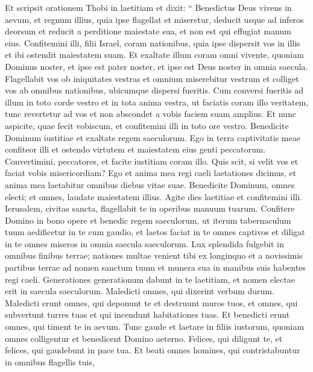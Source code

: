 \begin{biblechapter}
\begin{biblechapter}
\begin{biblechapter}
\begin{biblechapter}
\begin{biblechapter}
\begin{biblechapter}
\begin{biblechapter}
\begin{biblechapter}
\begin{biblechapter}
\begin{biblechapter}
\begin{biblechapter}
\begin{biblechapter}
\begin{biblechapter}
\verse Et scripsit orationem Thobi in laetitiam et dixit:
 \verse “ Benedictus Deus vivens in aevum, et regnum illius,
 quia ipse flagellat et miseretur,
 deducit usque ad inferos deorsum
 et reducit a perditione maiestate sua,
 et non est qui effugiat manum eius. 
\verse Confitemini illi, filii Israel, coram nationibus,
 quia ipse dispersit vos in illis
 \verse et ibi ostendit maiestatem suam.
 Et exaltate illum coram omni vivente,
 quoniam Dominus noster, et ipse est pater noster,
 et ipse est Deus noster in omnia saecula.
 \verse Flagellabit vos ob iniquitates vestras
 et omnium miserebitur vestrum
 et colliget vos ab omnibus nationibus,
 ubicumque dispersi fueritis.
 \verse Cum conversi fueritis ad illum
 in toto corde vestro et in tota anima vestra,
 ut faciatis coram illo veritatem,
 tunc revertetur ad vos
 et non abscondet a vobis faciem suam amplius.
 Et nunc aspicite, quae fecit vobiscum,
 et confitemini illi in toto ore vestro. Benedicite Dominum iustitiae
 et exaltate regem saeculorum.
 Ego in terra captivitatis meae confiteor illi
 et ostendo virtutem et maiestatem eius genti peccatorum.
 Convertimini, peccatores, et facite iustitiam coram illo.
 Quis scit, si velit vos et faciat vobis misericordiam?
 \verse Ego et anima mea regi caeli laetationes dicimus,
 et anima mea laetabitur omnibus diebus vitae suae.
 \verse Benedicite Dominum, omnes electi; et omnes, laudate maiestatem illius. Agite dies laetitiae et confitemini illi.
 \verse Ierusalem, civitas sancta,
 flagellabit te in operibus manuum tuarum.
 \verse Confitere Domino in bono opere et benedic regem saeculorum,
 ut iterum tabernaculum tuum aedificetur in te cum gaudio,
 et laetos faciat in te omnes captivos et diligat in te omnes miseros in omnia saecula saeculorum.
 \verse Lux splendida fulgebit in omnibus finibus terrae;
 nationes multae venient tibi ex longinquo
 et a novissimis partibus terrae ad nomen sanctum tuum
 et munera sua in manibus suis habentes regi caeli.
 Generationes generationum dabunt in te laetitiam,
 et nomen electae erit in saecula saeculorum.
 \verse Maledicti omnes, qui dixerint verbum durum.
 Maledicti erunt omnes, qui deponunt te
 et destruunt muros tuos,
 et omnes, qui subvertunt turres tuas et qui incendunt habitationes tuas. Et benedicti erunt omnes, qui timent te in aevum.
 \verse Tunc gaude et laetare in filiis iustorum,
 quoniam omnes colligentur
 et benedicent Domino aeterno.
 \verse Felices, qui diligunt te,
 et felices, qui gaudebunt in pace tua.
 Et beati omnes homines,
 qui contristabuntur in omnibus flagellis tuis,

\end{biblechapter}
\end{biblechapter}
\end{biblechapter}
\end{biblechapter}
\end{biblechapter}
\end{biblechapter}
\end{biblechapter}
\end{biblechapter}
\end{biblechapter}
\end{biblechapter}
\end{biblechapter}
\end{biblechapter}
\end{biblechapter}
